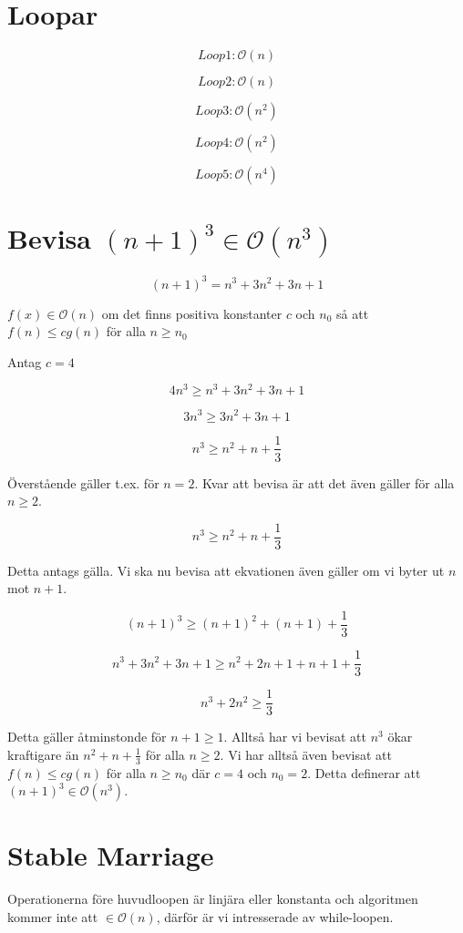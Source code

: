 \documentclass{article}
\newcommand{\Ordo}{\mathcal{O}}
\begin{document}
\section*{Loopar}

\[Loop 1: \Ordo(n)\]

\[Loop 2: \Ordo(n)\]

\[Loop 3: \Ordo(n^2)\]

\[Loop 4: \Ordo(n^2)\]

\[Loop 5: \Ordo(n^4)\]

\section*{Bevisa $(n+1)^3 \in \Ordo(n^3)$}

\[(n+1)^3 = n^3 + 3n^2 + 3n + 1\]

$f(x) \in \Ordo(n)$ om det finns positiva konstanter $c$ och $n_0$ så att $f(n) \leq cg(n)$ för alla $n \geq n_0$

Antag $c = 4$

\[4n^3 \geq n^3 + 3n^2 + 3n + 1\]

\[3n^3 \geq 3n^2 + 3n + 1\]

\[n^3 \geq n^2 + n + \frac{1}{3}\]

Överstående gäller t.ex. för $n=2$. Kvar att bevisa är att det även gäller för alla $n \geq 2$.

\[n^3 \geq n^2 + n + \frac{1}{3}\]

Detta antags gälla. Vi ska nu bevisa att ekvationen även gäller om vi byter ut $n$ mot $n+1$.

\[(n+1)^3 \geq (n+1)^2 + (n+1) + \frac{1}{3}\]

\[n^3 + 3n^2 + 3n +1 \geq n^2 + 2n + 1 + n + 1 + \frac{1}{3}\]

\[n^3 + 2n^2 \geq \frac{1}{3}\]

Detta gäller åtminstonde för $n+1 \geq 1$. Alltså har vi bevisat att $n^3$ ökar kraftigare än $n^2+n+\frac{1}{3}$ för alla $n \geq 2$. Vi har alltså även bevisat att $f(n) \leq cg(n)$ för alla $n \geq n_0$ där $c = 4$ och $n_0 = 2$. Detta definerar att $(n+1)^3 \in \Ordo(n^3)$.

\section*{Stable Marriage}

Operationerna före huvudloopen är linjära eller konstanta och algoritmen kommer inte att $\in \Ordo(n)$, därför är vi intresserade av while-loopen.
\end{document}
